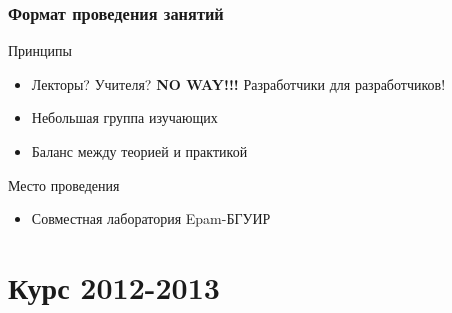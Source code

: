 \begin{frame}
	\frametitle{Формат проведения занятий}

	\begin{block}{Принципы}
		\begin{itemize}
			\item Лекторы? Учителя? {\bf NO WAY!!!} \newline 
				Разработчики для разработчиков! 
			\item Небольшая группа изучающих
			\item Баланс между теорией и практикой
		\end{itemize}
	\end{block}

	\begin{block}{Место проведения}
		\begin{itemize}
			\item Совместная лаборатория Epam-БГУИР 
		\end{itemize}
	\end{block}

\end{frame}

\section[2012]{Курс 2012-2013}

